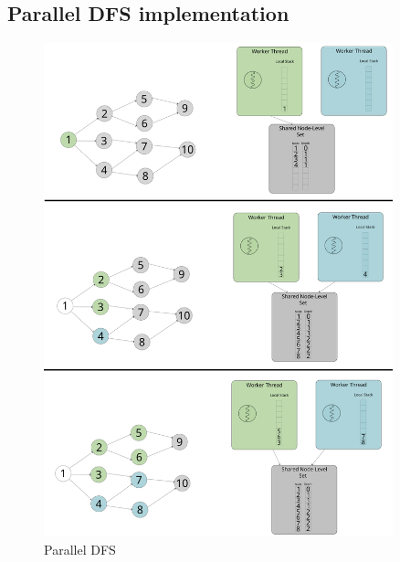 \subsection{Parallel DFS implementation}
\begin{figure}[ht]
    \centering
    \includegraphics[width=0.9\textwidth]{figures/parallelDFS.png}
    \caption{Parallel DFS}
    \label{fig:parallelDFS}
\end{figure}
